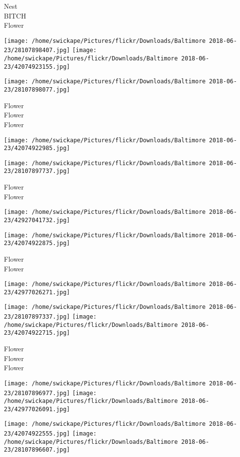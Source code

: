 \documentclass[10pt,letterpaper]{article}
\begin{document}
Nest\\
BITCH\\
Flower
\pagebreak

\texttt{[image: /home/swickape/Pictures/flickr/Downloads/Baltimore 2018-06-23/28107898407.jpg]}
\texttt{[image: /home/swickape/Pictures/flickr/Downloads/Baltimore 2018-06-23/42074923155.jpg]}

\texttt{[image: /home/swickape/Pictures/flickr/Downloads/Baltimore 2018-06-23/28107898077.jpg]}

Flower\\
Flower\\
Flower
\pagebreak

\texttt{[image: /home/swickape/Pictures/flickr/Downloads/Baltimore 2018-06-23/42074922985.jpg]}

\vspace{0.25in}
\texttt{[image: /home/swickape/Pictures/flickr/Downloads/Baltimore 2018-06-23/28107897737.jpg]}

Flower\\
Flower
\pagebreak

\texttt{[image: /home/swickape/Pictures/flickr/Downloads/Baltimore 2018-06-23/42927041732.jpg]}

\vspace{0.25in}
\texttt{[image: /home/swickape/Pictures/flickr/Downloads/Baltimore 2018-06-23/42074922875.jpg]}

Flower\\
Flower
\pagebreak

\texttt{[image: /home/swickape/Pictures/flickr/Downloads/Baltimore 2018-06-23/42977026271.jpg]}

\vspace{0.25in}
\texttt{[image: /home/swickape/Pictures/flickr/Downloads/Baltimore 2018-06-23/28107897337.jpg]}
\texttt{[image: /home/swickape/Pictures/flickr/Downloads/Baltimore 2018-06-23/42074922715.jpg]}

Flower\\
Flower\\
Flower
\pagebreak

\texttt{[image: /home/swickape/Pictures/flickr/Downloads/Baltimore 2018-06-23/28107896977.jpg]}
\texttt{[image: /home/swickape/Pictures/flickr/Downloads/Baltimore 2018-06-23/42977026091.jpg]}

\texttt{[image: /home/swickape/Pictures/flickr/Downloads/Baltimore 2018-06-23/42074922555.jpg]}
\texttt{[image: /home/swickape/Pictures/flickr/Downloads/Baltimore 2018-06-23/28107896607.jpg]}
\end{document}
